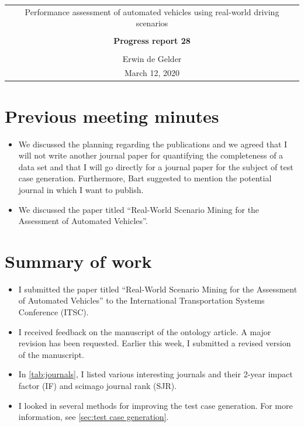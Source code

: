 \documentclass[10pt,final,a4paper,oneside,onecolumn]{article}
\newcommand{\progressreportnumber}{28}
\renewcommand{\author}{Erwin de Gelder}
\renewcommand{\date}{March 12, 2020}
\renewcommand{\title}{Performance assessment of automated vehicles using real-world driving scenarios}
\begin{document}
	
\begin{center}
	\begin{tabular}{c}
		\title \\ \\
		\textbf{\huge Progress report \progressreportnumber} \\ \\
		\author \\ 
		\date
	\end{tabular}
\end{center}

\section{Previous meeting minutes}

\begin{itemize}
	\item We discussed the planning regarding the publications and we agreed that I will not write another journal paper for quantifying the completeness of a data set and that I will go directly for a journal paper for the subject of test case generation. Furthermore, Bart suggested to mention the potential journal in which I want to publish.
	\item We discussed the paper titled ``Real-World Scenario Mining for the Assessment of Automated Vehicles''.
\end{itemize}

\section{Summary of work}

\begin{itemize}
	\item I submitted the paper titled ``Real-World Scenario Mining for the Assessment of Automated Vehicles'' to the International Transportation Systems Conference (ITSC).
	\item I received feedback on the manuscript of the ontology article. A major revision has been requested. Earlier this week, I submitted a revised version of the manuscript.
	\item In \cref{tab:journals}, I listed various interesting journals and their 2-year impact factor (IF) and scimago journal rank (SJR).
	\item I looked in several methods for improving the test case generation. For more information, see \cref{sec:test case generation}.
\end{itemize}
\end{document}
